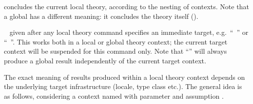 \begin{isabellebody}
\begin{isamarkuptext}
\begin{description}
  \item \hyperlink{command.local.end}{\mbox{}} concludes the current local theory,
  according to the nesting of contexts.  Note that a global \hyperlink{command.global.end}{\mbox{}} has a different meaning: it concludes the theory
  itself ().
  
  \item {}\hypertarget{keyword.in}{\hyperlink{keyword.in}{\mbox{}}}~ given after any
  local theory command specifies an immediate target, e.g.\
  ``\hyperlink{command.definition}{\mbox{}}~'' or ``\hyperlink{command.theorem}{\mbox{}}~''.  This works both in a local or
  global theory context; the current target context will be suspended
  for this command only.  Note that ``'' will
  always produce a global result independently of the current target
  context.

  \end{description}

  The exact meaning of results produced within a local theory context
  depends on the underlying target infrastructure (locale, type class
  etc.).  The general idea is as follows, considering a context named
  \isa{c} with parameter \isa{x} and assumption .
  

\end{isamarkuptext}
\end{isabellebody}

